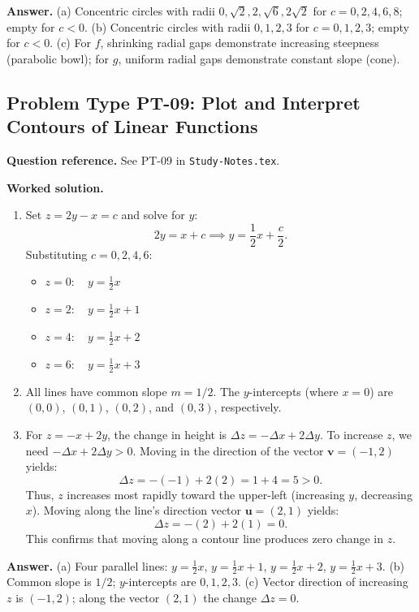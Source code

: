 \documentclass[11pt,letterpaper]{article}
\begin{document}
\textbf{Answer.}
(a) Concentric circles with radii $0, \sqrt{2}, 2, \sqrt{6}, 2\sqrt{2}$ for $c = 0, 2, 4, 6, 8$; empty for $c<0$.
(b) Concentric circles with radii $0, 1, 2, 3$ for $c = 0, 1, 2, 3$; empty for $c<0$.
(c) For $f$, shrinking radial gaps demonstrate increasing steepness (parabolic bowl); for $g$, uniform radial gaps demonstrate constant slope (cone).

\subsection{Problem Type PT-09: Plot and Interpret Contours of Linear Functions}
\textbf{Question reference.} See PT-09 in \texttt{Study-Notes.tex}.

\textbf{Worked solution.}
\begin{enumerate}[label=(\alph*),leftmargin=*]
    \item Set $z = 2y - x = c$ and solve for $y$:
    \[ 2y = x + c \implies y = \frac{1}{2}x + \frac{c}{2}. \]
    Substituting $c = 0, 2, 4, 6$:
    \begin{itemize}[nosep]
        \item $z = 0: \quad y = \frac{1}{2}x$
        \item $z = 2: \quad y = \frac{1}{2}x + 1$
        \item $z = 4: \quad y = \frac{1}{2}x + 2$
        \item $z = 6: \quad y = \frac{1}{2}x + 3$
    \end{itemize}
    \item All lines have common slope $m = 1/2$. The $y$-intercepts (where $x=0$) are $(0,0)$, $(0,1)$, $(0,2)$, and $(0,3)$, respectively.
    \item For $z = -x + 2y$, the change in height is $\Delta z = -\Delta x + 2\Delta y$.
    To increase $z$, we need $-\Delta x + 2\Delta y > 0$. Moving in the direction of the vector $\mathbf{v} = (-1, 2)$ yields:
    \[ \Delta z = -(-1) + 2(2) = 1 + 4 = 5 > 0. \]
    Thus, $z$ increases most rapidly toward the upper-left (increasing $y$, decreasing $x$).
    Moving along the line's direction vector $\mathbf{u} = (2, 1)$ yields:
    \[ \Delta z = -(2) + 2(1) = 0. \]
    This confirms that moving along a contour line produces zero change in $z$.
\end{enumerate}

\textbf{Answer.}
(a) Four parallel lines: $y = \frac{1}{2}x$, $y = \frac{1}{2}x+1$, $y = \frac{1}{2}x+2$, $y = \frac{1}{2}x+3$.
(b) Common slope is $1/2$; $y$-intercepts are $0, 1, 2, 3$.
(c) Vector direction of increasing $z$ is $(-1, 2)$; along the vector $(2, 1)$ the change $\Delta z = 0$.
\end{document}
